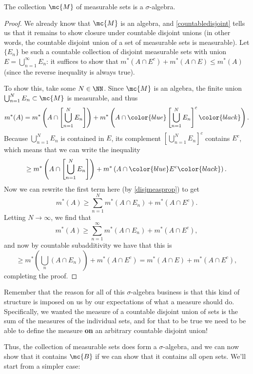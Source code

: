 \begin{theorem}
The collection $\mc{M}$ of measurable sets is a $\sigma$-algebra.
\end{theorem}
\begin{proof}
We already know that $\mc{M}$ is an algebra, and \cref{countabledisjoint} tells us that it remains to show closure under countable disjoint unions (in other words, the countable disjoint union of a set of measurable sets is measurable). Let $\{E_n\}$ be such a countable collection of disjoint measurable sets with union $E = \bigcup_{n=1}^{\infty} E_n$: it suffices to show that $m^\ast(A \cap E^c) + m^\ast(A \cap E) \le m^\ast(A)$ (since the reverse inequality is always true). 

To show this, take some $N \in \NN$. Since $\mc{M}$ is an algebra, the finite union $\bigcup_{n=1}^N E_n \subset \mc{M}$ is measurable, and thus
\[
    m^\ast(A) = m^\ast\left(A \cap \left[\bigcup_{n=1}^N E_n\right]\right) + m^\ast\left(A \cap \color{blue}\left[\bigcup_{n=1}^N E_n\right]^c\color{black}\right).
\]
Because $\bigcup_{n=1}^N E_n$ is contained in $E$, its complement $\left[\bigcup_{n=1}^N E_n\right]^c$ contains $E^c$, which means that we can write the inequality
\[
    \ge  m^\ast\left(A \cap \left[\bigcup_{n=1}^N E_n\right]\right) + m^\ast\left(A \cap \color{blue}E^c\color{black}\right).
\]
Now we can rewrite the first term here (by \cref{disjmeasprop}) to get
\[
     m^\ast(A) \ge \sum_{n=1}^N m^\ast(A \cap E_n) + m^\ast(A \cap E^c).
\]
Letting $N \to \infty$, we find that 
\[
    m^\ast(A) \ge \sum_{n=1}^{\infty} m^\ast(A \cap E_n) + m^\ast(A \cap E^c),
\]
and now by countable subadditivity we have that this is
\[
    \ge m^\ast\left(\bigcup_n (A \cap E_n)\right) + m^\ast(A \cap E^c) = m^\ast(A \cap E) + m^\ast(A \cap E^c),
\]
completing the proof.
\end{proof}

\begin{remark}
Remember that the reason for all of this $\sigma$-algebra business is that this kind of structure is imposed on us by our expectations of what a measure should do. Specifically, we wanted the measure of a countable disjoint union of sets is the sum of the measures of the individual sets, and for that to be true we need to be able to define the measure \textbf{on} an arbitrary countable disjoint union!
\end{remark}

Thus, the collection of measurable sets does form a $\sigma$-algebra, and we can now show that it contains $\mc{B}$ if we can show that it contains all open sets. We'll start from a simpler case:

